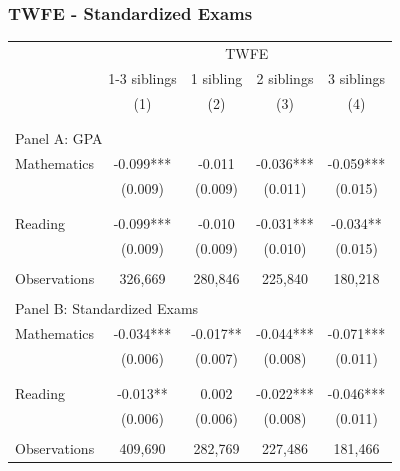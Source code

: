 \documentclass{beamer}
\begin{document}
\begin{frame}
\label{frame:twfeexams}
\frametitle{TWFE - Standardized Exams}
       \centering
       \resizebox{0.7\textwidth}{!}%
{
\makeatother
\begin{tabular}{lcccc}
\toprule
\cmidrule(lr){2-5}
& \multicolumn{4}{c}{TWFE} \\
\cmidrule(lr){2-5}
& 1-3 siblings & 1 sibling & 2 siblings & 3 siblings  \\
\cmidrule(lr){2-2} \cmidrule(lr){3-3} \cmidrule(lr){4-4} \cmidrule(lr){5-5}
& (1) & (2) & (3) & (4) \\
\bottomrule
&  &  & &  \\
&  &  & &  \\
\multicolumn{5}{l}{Panel A: GPA } \\
Mathematics         &      -0.099***&      -0.011   &      -0.036***&      -0.059***\\
                    &     (0.009)   &     (0.009)   &     (0.011)   &     (0.015)   \\
                    &               &               &               &               \\ 
&  &  & &  \\
Reading             &      -0.099***&      -0.010   &      -0.031***&      -0.034** \\
                    &     (0.009)   &     (0.009)   &     (0.010)   &     (0.015)   \\
                    &               &               &               &               \\
Observations        &     326,669   &     280,846   &     225,840   &     180,218   \\
 
&  &  & &  \\
\multicolumn{5}{l}{Panel B: Standardized Exams } \\
Mathematics         &      -0.034***&      -0.017** &      -0.044***&      -0.071***\\
                    &     (0.006)   &     (0.007)   &     (0.008)   &     (0.011)   \\
                    &               &               &               &               \\ 
&  &  & &  \\
Reading             &      -0.013** &       0.002   &      -0.022***&      -0.046***\\
                    &     (0.006)   &     (0.006)   &     (0.008)   &     (0.011)   \\
                    &               &               &               &               \\
Observations        &     409,690   &     282,769   &     227,486   &     181,466   \\
 

\bottomrule
\end{tabular}
}

\end{frame}
\end{document}
